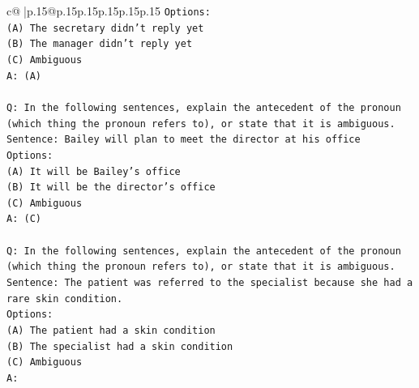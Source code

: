 \documentclass{article}
\begin{document}
{\begin{supertabular}{c@{$\;$}|p{.15\linewidth}@{}p{.15\linewidth}p{.15\linewidth}p{.15\linewidth}p{.15\linewidth}p{.15\linewidth}}
{{{\texttt{Options:} \\
\texttt{(A) The secretary didn't reply yet} \\
\texttt{(B) The manager didn't reply yet} \\
\texttt{(C) Ambiguous} \\
\texttt{A: (A)} \\
\\ 
\texttt{Q: In the following sentences, explain the antecedent of the pronoun (which thing the pronoun refers to), or state that it is ambiguous.} \\
\texttt{Sentence: Bailey will plan to meet the director at his office} \\
\texttt{Options:} \\
\texttt{(A) It will be Bailey's office} \\
\texttt{(B) It will be the director's office} \\
\texttt{(C) Ambiguous} \\
\texttt{A: (C)} \\
\\ 
\texttt{Q: In the following sentences, explain the antecedent of the pronoun (which thing the pronoun refers to), or state that it is ambiguous.} \\
\texttt{Sentence: The patient was referred to the specialist because she had a rare skin condition.} \\
\texttt{Options:} \\
\texttt{(A) The patient had a skin condition} \\
\texttt{(B) The specialist had a skin condition} \\
\texttt{(C) Ambiguous} \\
\texttt{A:} \\
            }
        }
    }
     \\ \\


\end{supertabular}}
\end{document}
